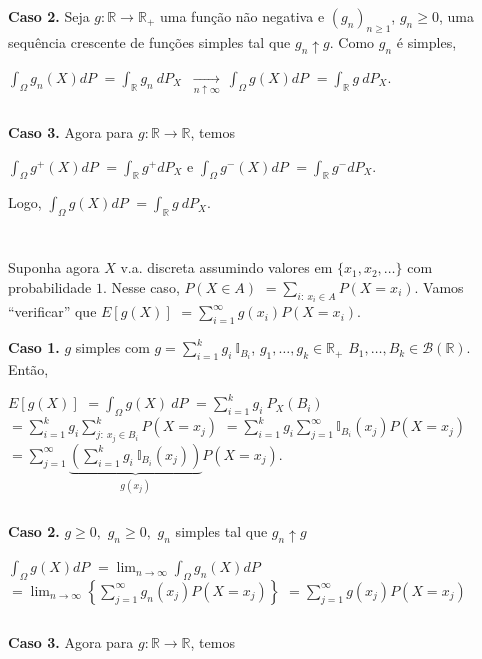 \documentclass[
]{book}
\begin{document}
\textbf{Caso 2.} Seja \(g:\mathbb{R}\longrightarrow\mathbb{R}_+\) uma função não negativa e \((g_n)_{n\geq1}\), \(g_n \geq 0\), uma sequência crescente de funções simples tal que \(g_n\uparrow g\). Como \(g_n\) é simples,

\(\displaystyle\int_\Omega g_n(X)dP\) \(=\displaystyle\int_{\mathbb{R}}g_n~dP_X\) \(\displaystyle~\underset{n\uparrow\infty}{\longrightarrow}~ \int_\Omega g(X)dP\) \(=\displaystyle\int_{\mathbb{R}}g~dP_X\).

\(~\)

\textbf{Caso 3.} Agora para \(g: \mathbb{R} \longrightarrow \mathbb{R}\), temos

\(\displaystyle\int_\Omega g^+(X)dP\) \(=\displaystyle\int_{\mathbb{R}}g^+dP_X\) e \(\displaystyle\int_\Omega g^-(X)dP\) \(=\displaystyle\int_{\mathbb{R}}g^-dP_X\).

Logo, \(\displaystyle\int_\Omega g(X)dP\) \(=\displaystyle\int_{\mathbb{R}}g~dP_X\).

\(~\)

\(~\)

Suponha agora \(X\) v.a. discreta assumindo valores em \(\{x_1,x_2,\ldots\}\) com probabilidade \(1\). Nesse caso, \(P(X \in A)\) \(=\displaystyle\sum_{i:~x_i\in A} P(X=x_i)\). Vamos ``verificar'' que \(E\left[g(X)\right]\) \(=\displaystyle\sum_{i=1}^\infty g(x_i)P(X=x_i)\).

\textbf{Caso 1.} \(g\) simples com \(g = \displaystyle\sum_{i=1}^kg_i~\mathbb{I}_{B_i}\), \(g_1,\ldots,g_k \in \mathbb{R}_+\) \(B_1,\ldots,B_k \in \mathcal{B}(\mathbb{R})\). Então,

\(E\left[g(X)\right]\) \(=\displaystyle\int_\Omega g(X)~dP\)
\(=\displaystyle\sum_{i=1}^k g_i~P_X(B_i)\)
\(=\displaystyle\sum_{i=1}^k g_i \sum_{j:~x_j \in B_i}^k P(X = x_j)\)
\(=\displaystyle\sum_{i=1}^k g_i \sum_{j=1}^\infty \mathbb{I}_{B_i}(x_j)P(X=x_j)\)
\(=\displaystyle\sum_{j=1}^\infty \underbrace{\left(\sum_{i=1}^k g_i ~\mathbb{I}_{B_i}(x_j)\right)}_{g(x_j)}P(X = x_j)\).

\(~\)

\textbf{Caso 2.} \(g\geq 0,\) \(g_n\geq0,\) \(g_n\) simples tal que \(g_n \uparrow g\)

\(\displaystyle\int_\Omega g(X)dP\) \(=\displaystyle\lim_{n\rightarrow\infty}\int_\Omega g_n(X)dP\) \(=\displaystyle\lim_{n\rightarrow\infty}\left\{\sum_{j=1}^\infty g_n(x_j)P(X=x_j)\right\}\) \(=\displaystyle\sum_{j=1}^\infty g(x_j)P(X = x_j)\)

\(~\)

\textbf{Caso 3.} Agora para \(g: \mathbb{R} \longrightarrow \mathbb{R}\), temos
\end{document}
